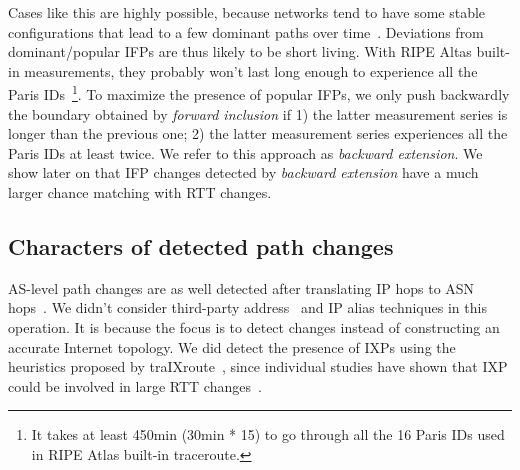 Cases like this are highly possible, because networks tend to have some stable configurations that lead to a few dominant paths over time~\cite{Chandrasekaran, Pucha2007}. 
Deviations from dominant/popular IFPs are thus likely to be short living.
With RIPE Altas built-in measurements, they probably won't last long enough to experience all the Paris IDs~\footnote{It takes at least 450min (30min * 15) to go through all the 16 Paris IDs used in RIPE Atlas built-in traceroute.}.
To maximize the presence of popular IFPs, we only push backwardly the boundary obtained by \textit{forward inclusion} if 1) the latter measurement series is longer than the previous one; 2) the latter measurement series experiences all the Paris IDs at least twice.
We refer to this approach as \textit{backward extension}.
We show later on that IFP changes detected by \textit{backward extension} have a much larger chance matching with RTT changes.

\subsection{Characters of detected path changes}
AS-level path changes are as well detected after translating IP hops to ASN hops~\cite{routeviews}.
We didn't consider third-party address~\cite{Hyun2003, Zhang2010} and IP alias techniques\cite{Gunes2009,Keys2010a} in this operation.
It is because the focus is to detect changes instead of constructing an accurate Internet topology.
We did detect the presence of IXPs using the heuristics proposed by traIXroute~\cite{Nomikos2016}, since individual studies have shown that IXP could be involved in large RTT changes~\cite{kopp2016}.

